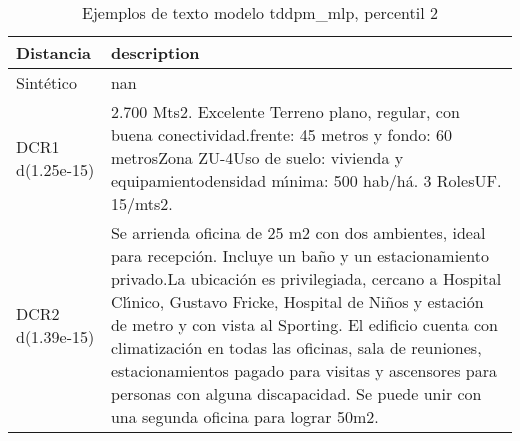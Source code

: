 \begin{table}[H]
\centering
\fontsize{10}{14}\selectfont
\caption{Ejemplos de texto modelo tddpm\_mlp, percentil 2}
\label{table-example-economicos-b-2-tddpm_mlp-2p-text}
\begin{tabular}{|l|m{35em}|}
\hline
\rowcolor[gray]{0.8}
Distancia & description \\
\hline Sintético & nan \\
\hline DCR1 d(1.25e-15) & 2.700 Mts2. Excelente Terreno plano, regular, con buena conectividad.frente: 45 metros y fondo: 60 metrosZona ZU-4Uso de suelo: vivienda y equipamientodensidad m{\'\i}nima: 500 hab/h\'a. 3 RolesUF. 15/mts2. \\
\hline DCR2 d(1.39e-15) & Se arrienda oficina de 25 m2  con dos ambientes, ideal para recepci\'on. Incluye un ba\~no y un estacionamiento privado.La ubicaci\'on es privilegiada, cercano a Hospital Cl{\'\i}nico,  Gustavo Fricke,  Hospital de Ni\~nos y estaci\'on de metro y con vista al Sporting. El edificio cuenta con climatizaci\'on en todas las oficinas, sala de reuniones, estacionamientos pagado para visitas y ascensores para personas con alguna discapacidad. Se puede unir con una segunda oficina para lograr 50m2. \\
\hline
\end{tabular}
\end{table}
